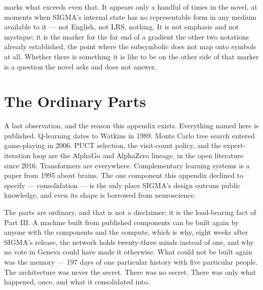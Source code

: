 \void marks what exceeds even that. It appears only a handful of times in the novel, at moments when SIGMA's internal state has no representable form in any medium available to it --- not English, not LRS, nothing. It is not emphasis and not mystique; it is the marker for the far end of a gradient the other two notations already established, the point where the subsymbolic does not map onto symbols at all. Whether there is something it is like to be on the other side of that marker is a question the novel asks and does not answer.

\section*{The Ordinary Parts}

A last observation, and the reason this appendix exists. Everything named here is published. Q-learning dates to Watkins in 1989. Monte Carlo tree search entered game-playing in 2006. PUCT selection, the visit-count policy, and the expert-iteration loop are the AlphaGo and AlphaZero lineage, in the open literature since 2016. Transformers are everywhere. Complementary learning systems is a paper from 1995 about brains. The one component this appendix declined to specify --- consolidation --- is the only place SIGMA's design outruns public knowledge, and even its shape is borrowed from neuroscience.

The parts are ordinary, and that is not a disclaimer; it is the load-bearing fact of Part III. A machine built from published components can be built again by anyone with the components and the compute, which is why, eight weeks after SIGMA's release, the network holds twenty-three minds instead of one, and why no vote in Geneva could have made it otherwise. What could not be built again was the memory --- 197 days of one particular history with five particular people. The architecture was never the secret. There was no secret. There was only what happened, once, and what it consolidated into.
